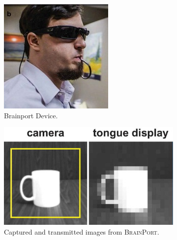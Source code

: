 \documentclass[
12pt, %
oneside, %
english, %
doublespacing, %
headsepline, %
]{MastersDoctoralThesis} %
\begin{document}
\begin{figure}[th]
	\centering
  \begin{subfigure}[b]{0.4\textwidth}
    \includegraphics[height=0.75\textwidth]{images/Brainport}
		\decoRule
    \caption[BrainPort Device]{Brainport Device.}
    \label{fig:bp1}
  \end{subfigure}
  \begin{subfigure}[b]{0.4\textwidth}
    \includegraphics[height=0.75\textwidth]{images/Brainport2}
		\decoRule
    \caption[\textsc{BrainPort} images]{Captured and transmitted images from \textsc{BrainPort}.}
    \label{fig:bp2}
  \end{subfigure}
	\caption[\textsc{BrainPort} implementation]{}
\end{figure}
\end{document}
